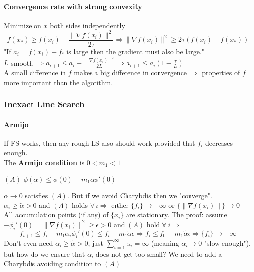 \documentclass[10pt]{report}
\begin{document}
\paragraph{Convergence rate with strong convexity} Minimize on $x$ both sides independently $$f(x_*)\geq f(x_i) - \frac{\|\nabla f(x_i)\|^2}{2\tau} \Rightarrow \|\nabla f(x_i)\|^2\geq 2\tau(f(x_i)-f(x_*))$$
"If $a_i = f(x_i) - f_*$ is large then the gradient must also be large."\\
$L$-smooth $\Rightarrow a_{i+1}\leq a_i - \frac{\|\nabla f(x_i)\|^2}{2L} \Rightarrow a_{i+1}\leq a_i(1-\frac{\tau}{L})$\\
A small difference in $f$ makes a big difference in convergence $\Rightarrow$ properties of $f$ more important than the algorithm.
\subsubsection{Inexact Line Search}
\paragraph{Armijo} If FS works, then any rough LS also should work provided that $f_i$ decreases enough.\\
The \textbf{Armijo condition} is $0 < m_1 < 1$
\begin{list}{}{}
	\item[$(A)$] $\phi(\alpha)\leq \phi(0)+m_1\alpha\phi'(0)$
\end{list}
$\alpha \rightarrow 0$ satisfies $(A)$. But if we avoid Charybdis then we "converge".\\
$\alpha_i\geq \tilde{\alpha} > 0$ and $(A)$ holds $\forall\:i\Rightarrow$ either $\{f_i\}\rightarrow -\infty$ or $\{\|\nabla f(x_i)\|\}\rightarrow 0$\\
All accumulation points (if any) of $\{x_i\}$ are stationary. The proof: assume $-\phi_i'(0) = \|\nabla f(x_i)\|^2\geq \epsilon > 0$ and $(A)$ hold $\forall\:i\Rightarrow$ $$f_{i+1} \leq f_i + m_1\alpha_i\phi_i'(0)\leq f_i - m_1\tilde{\alpha}\epsilon \Rightarrow f_i \leq f_0 - m_1\tilde{\alpha}\epsilon \Rightarrow \{f_i\}\rightarrow -\infty$$ Don't even need $\alpha_i\geq \tilde{\alpha} > 0$, just $\sum_{i=1}^\infty \alpha_i = \infty$ (meaning $\alpha_i\rightarrow 0$ "slow enough"), but how do we ensure that $\alpha_i$ does not get too small? We need to add a Charybdis avoiding condition to $(A)$
\end{document}
